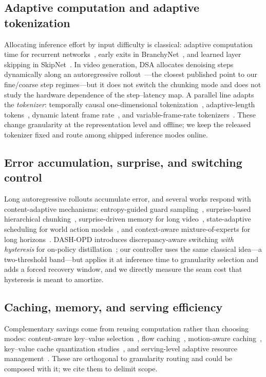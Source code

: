 \documentclass[journal]{IEEEtran}
\begin{document}
\subsection{Adaptive computation and adaptive tokenization}
Allocating inference effort by input difficulty is classical: adaptive computation time for recurrent networks~\cite{gravesAdaptiveComputationTime2017}, early exits in BranchyNet~\cite{teerapittayanonBranchyNetFastInference2017}, and learned layer skipping in SkipNet~\cite{wangSkipNetLearningDynamic2018}. In video generation, DSA allocates denoising steps dynamically along an autoregressive rollout~\cite{leDSADynamicStep2026}---the closest published point to our fine/coarse step regimes---but it does not switch the chunking mode and does not study the hardware dependence of the step--latency map. A parallel line adapts the \emph{tokenizer}: temporally causal one-dimensional tokenization~\cite{liLearningAdaptiveTemporally2025}, adaptive-length tokens~\cite{xiongEVATokAdaptiveLength2026}, dynamic latent frame rate~\cite{yuanDLFRVAEDynamicLatent2025}, and variable-frame-rate tokenizers~\cite{zhongVFRTokVariableFrame2025}. These change granularity at the representation level and offline; we keep the released tokenizer fixed and route among shipped inference modes online.

\subsection{Error accumulation, surprise, and switching control}
Long autoregressive rollouts accumulate error, and several works respond with content-adaptive mechanisms: entropy-guided guard sampling~\cite{hanEntropyGuidedKGuard2026}, surprise-based hierarchical chunking~\cite{iiyamaSUNTAHierarchical2026}, surprise-driven memory for long video~\cite{shiSurpriseForcingWhat2026}, state-adaptive scheduling for world action models~\cite{sunSANTSStateAdaptiveScheduler2026}, and context-aware mixture-of-experts for long horizons~\cite{shangLongScapeAdvancingLongHorizon2025}. DASH-OPD introduces discrepancy-aware switching \emph{with hysteresis} for on-policy distillation~\cite{xiaDASHOPDDiscrepancy2026}; our controller uses the same classical idea---a two-threshold band---but applies it at inference time to granularity selection and adds a forced recovery window, and we directly measure the seam cost that hysteresis is meant to amortize.

\subsection{Caching, memory, and serving efficiency}
Complementary savings come from reusing computation rather than choosing modes: content-aware key--value selection~\cite{caiFocusedForcingContentAware2026}, flow caching~\cite{maFlowCachingAutoregressive2026}, motion-aware caching~\cite{xuMotionAwareCachingEfficient2026}, key--value cache quantization studies~\cite{ranganathKVCacheQuantization2026}, and serving-level adaptive resource management~\cite{xiaAdaptiveResourceManagement2026}. These are orthogonal to granularity routing and could be composed with it; we cite them to delimit scope.
\end{document}
